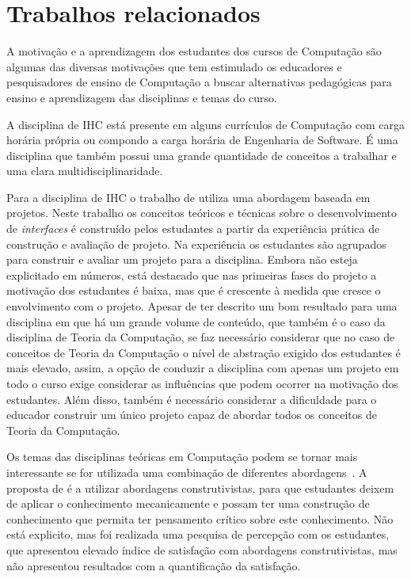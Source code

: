 \section{Trabalhos relacionados}
\label{sec-revisao-relacionados}
A motivação e a aprendizagem dos estudantes dos cursos
de Computação são algumas das diversas motivações que tem
estimulado os educadores e pesquisadores de ensino de Computação
a buscar alternativas pedagógicas para ensino e aprendizagem
das disciplinas e temas do curso.

A disciplina de \ac{IHC} está presente em
alguns currículos de Computação com carga horária
própria ou compondo a carga horária de Engenharia de Software.
É uma disciplina que também possui uma grande quantidade de conceitos
a trabalhar e uma clara multidisciplinaridade.

Para a disciplina de \ac{IHC} o trabalho de \cite{pelissoni2003proposta}
utiliza uma abordagem baseada em projetos.
Neste trabalho os conceitos teóricos e técnicas
sobre o desenvolvimento de \textit{interfaces} é construído
pelos estudantes a partir da experiência prática
de construção e avaliação de projeto.
Na experiência os estudantes são agrupados para construir e
avaliar um projeto para a disciplina.
Embora não esteja explicitado em números, está destacado que nas
primeiras fases do projeto a motivação dos estudantes é baixa,
mas que é crescente à medida que cresce o envolvimento com
o projeto.
Apesar de ter descrito um bom resultado para
uma disciplina em que há um grande volume de conteúdo,
que também é o caso da disciplina de Teoria da Computação,
se faz necessário considerar que no caso de conceitos de
Teoria da Computação o nível de abstração exigido dos estudantes
é mais elevado, assim, a opção de conduzir a disciplina com apenas
um projeto em todo o curso exige considerar as influências
que podem ocorrer na motivação dos estudantes.
Além disso, também é necessário considerar a dificuldade para o
educador construir um único projeto capaz de abordar todos os
conceitos de Teoria da Computação.

Os temas das disciplinas teóricas em Computação podem
se tornar mais interessante se for utilizada uma combinação
de diferentes abordagens~\cite{chesnevar2004didactic}.
A proposta de \cite{chesnevar2004didactic} é a utilizar
abordagens construtivistas, para que estudantes deixem
de aplicar o conhecimento mecanicamente e possam ter
uma construção de conhecimento que permita ter pensamento
crítico sobre este conhecimento.
Não está explicito, mas foi realizada uma pesquisa
de percepção com os estudantes, que apresentou elevado índice
de satisfação com abordagens construtivistas, mas não
apresentou resultados com a quantificação da satisfação.

